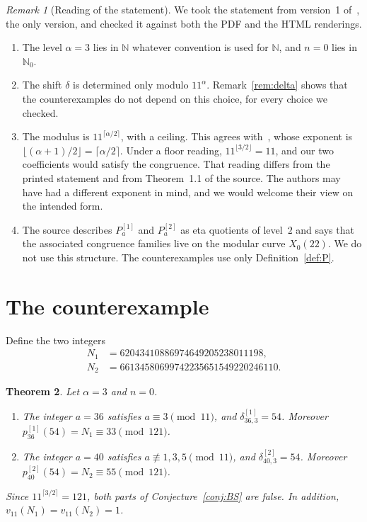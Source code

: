 \documentclass[11pt]{amsart}
\newtheorem{theorem}{Theorem}[section]
\theoremstyle{definition}
\theoremstyle{remark}
\newtheorem{remark}[theorem]{Remark}
\newcommand{\N}{\mathbb{N}}
\newcommand{\Pone}[1]{P^{[1]}_{#1}}
\newcommand{\Ptwo}[1]{P^{[2]}_{#1}}
\newcommand{\pone}[1]{p^{[1]}_{#1}}
\newcommand{\ptwo}[1]{p^{[2]}_{#1}}
\newcommand{\done}[2]{\delta^{[1]}_{#1,#2}}
\newcommand{\dtwo}[2]{\delta^{[2]}_{#1,#2}}
\newcommand{\val}{v_{11}}
\begin{document}
\begin{remark}[Reading of the statement]\label{rem:reading}
We took the statement from version~1 of~\cite{BS}, the only version, and checked it against both the PDF and the HTML renderings.
\begin{enumerate}
\item The level \(\alpha=3\) lies in \(\N\) whatever convention is used for \(\N\), and \(n=0\) lies in \(\N_0\).
\item The shift \(\delta\) is determined only modulo \(11^\alpha\). Remark~\ref{rem:delta} shows that the counterexamples do not depend on this choice, for every choice we checked.
\item The modulus is \(11^{\lceil\alpha/2\rceil}\), with a ceiling. This agrees with~\cite[Thm.~1.1]{BS}, whose exponent is \(\lfloor(\alpha+1)/2\rfloor=\lceil\alpha/2\rceil\). Under a floor reading, \(11^{\lfloor3/2\rfloor}=11\), and our two coefficients would satisfy the congruence. That reading differs from the printed statement and from Theorem~1.1 of the source. The authors may have had a different exponent in mind, and we would welcome their view on the intended form.
\item The source describes \(\Pone{a}\) and \(\Ptwo{a}\) as eta quotients of level~\(2\) and says that the associated congruence families live on the modular curve \(X_0(22)\). We do not use this structure. The counterexamples use only Definition~\ref{def:P}.
\end{enumerate}
\end{remark}

\section{The counterexample}\label{sec:counter}

Define the two integers
\begin{align}
N_1&=62043410886974649205238011198, \label{eq:N1}\\
N_2&=66134580699742235651549220246110. \label{eq:N2}
\end{align}

\begin{theorem}\label{thm:main}
Let \(\alpha=3\) and \(n=0\).
\begin{enumerate}
\item[(1)] The integer \(a=36\) satisfies \(a\equiv3\pmod{11}\), and \(\done{36}{3}=54\). Moreover \(\pone{36}(54)=N_1\equiv33\pmod{121}\).
\item[(2)] The integer \(a=40\) satisfies \(a\not\equiv1,3,5\pmod{11}\), and \(\dtwo{40}{3}=54\). Moreover \(\ptwo{40}(54)=N_2\equiv55\pmod{121}\).
\end{enumerate}
Since \(11^{\lceil3/2\rceil}=121\), both parts of Conjecture~\ref{conj:BS} are false. In addition, \(\val(N_1)=\val(N_2)=1\).
\end{theorem}
\end{document}
